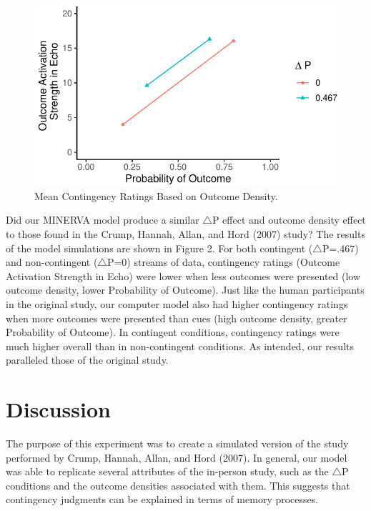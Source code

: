 \documentclass[
  english,
  man,floatsintext]{apa6}
\begin{document}
\begin{figure}

{\centering \includegraphics{thesis_files/figure-latex/unnamed-chunk-5-1} 

}

\caption{Mean Contingency Ratings Based on Outcome Density.}\label{fig:unnamed-chunk-5}
\end{figure}

Did our MINERVA model produce a similar \(\triangle\)P effect and outcome density effect to those found in the Crump, Hannah, Allan, and Hord (2007) study? The results of the model simulations are shown in Figure 2. For both contingent (\(\triangle\)P=.467) and non-contingent (\(\triangle\)P=0) streams of data, contingency ratings (Outcome Activation Strength in Echo) were lower when less outcomes were presented (low outcome density, lower Probability of Outcome). Just like the human participants in the original study, our computer model also had higher contingency ratings when more outcomes were presented than cues (high outcome density, greater Probability of Outcome). In contingent conditions, contingency ratings were much higher overall than in non-contingent conditions. As intended, our results paralleled those of the original study.

\hypertarget{discussion}{%
\section{Discussion}\label{discussion}}

The purpose of this experiment was to create a simulated version of the study performed by Crump, Hannah, Allan, and Hord (2007). In general, our model was able to replicate several attributes of the in-person study, such as the \(\triangle\)P conditions and the outcome densities associated with them. This suggests that contingency judgments can be explained in terms of memory processes.
\end{document}

